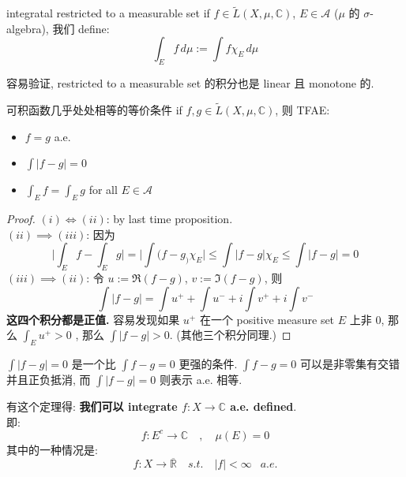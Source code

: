 \documentclass[lang=cn,11pt]{elegantbook}
\begin{document}
\begin{definition}{integratal restricted to a measurable set}
    if $f \in \tilde{L}(X, \mu, \mathbb{C})$, $E \in \mathcal{A}$ ($\mu$ 的 $\sigma$-algebra), 我们 define: $$\int_E f   \, d \mu := \int f  \chi_E \, d \mu$$\end{definition}
\begin{remark}
    容易验证, restricted to a measurable set 的积分也是 linear 且 monotone 的.
\end{remark}



\begin{proposition}{可积函数几乎处处相等的等价条件}
    if $f,g \in \tilde{L}(X, \mu, \mathbb{C})$, 则 TFAE: 
    \begin{itemize}
        \item $f=g $ a.e.
        \item $\int |f-g| = 0$
        \item $\int _E f = \int _E g$ for all $E \in \mathcal{A}$
    \end{itemize}
\end{proposition}
\begin{proof}
    $(i) \Longleftrightarrow (ii) $: by last time proposition.\\
    $(ii) \implies (iii)$: 因为 $$
    \Bigg|\int_E f - \int _E g  \Bigg|  = \Bigg| \int (f-g_)\chi_E  \Bigg| \leq \int |f-g| \chi_E \leq \int|f-g| = 0
    $$
    $(iii) \implies (ii)$: 令 $u := \Re (f-g)$, $v := \Im (f-g)$, 则 $$
    \int |f-g| = \int u^+ + \int u^- + i\int v^+ + i\int v^-
    $$
\textbf{这四个积分都是正值. }容易发现如果 $u^+$ 在一个 positive measure set $E$ 上非 0, 那么 $\int_E u^+ > 0$ , 那么 $\int |f-g| > 0$. (其他三个积分同理.)
\end{proof}
\begin{remark}
    $\int |f-g| = 0$ 是一个比 $\int f-g = 0$ 更强的条件. $\int f-g = 0$ 可以是非零集有交错并且正负抵消, 而 $\int |f-g| = 0$ 则表示 a.e. 相等.
    \end{remark}



\begin{remark}
    有这个定理得:\textbf{ 我们可以 integrate $f:X\rightarrow \mathbb{C}$ a.e. defined}.\\
    即: $$
    f: E^c \rightarrow \mathbb{C}\quad , \quad \mu(E) = 0
    $$
    其中的一种情况是: $$
    f: X \rightarrow \overline{\mathbb{R}} \quad s.t. \quad |f| < \infty  \;\;\ a.e.
    $$
\end{remark}
\end{document}
